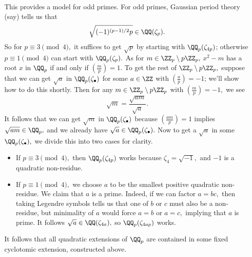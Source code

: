 This provides a model for odd primes. For odd primes, Gaussian period theory (say) tells us that
\[\sqrt{(-1)^{(p-1)/2}p}\in\QQ(\zeta_p).\]
So for $p\equiv3\pmod4,$ it suffices to get $\sqrt p$ by starting with $\QQ_p(\zeta_{4p})$; otherwise $p\equiv1\pmod4$ can start with $\QQ_p(\zeta_p).$ As for $m\in\ZZ_p\setminus p\ZZ_p,$ $x^2-m$ has a root $x$ in $\QQ_p$ if and only if $\left(\frac mp\right)=1.$ To get the rest of $\ZZ_p\setminus p\ZZ_p,$ suppose that we can get $\sqrt a$ in $\QQ_p(\zeta_\bullet)$ for some $a\in\ZZ$ with $\left(\frac ap\right)=-1$; we'll show how to do this shortly. Then for any $m\in\ZZ_p\setminus p\ZZ_p$ with $\left(\frac mp\right)=-1,$ we see
\[\sqrt m=\frac{\sqrt{am}}{\sqrt a}.\]
It follows that we can get $\sqrt m$ in $\QQ_p(\zeta_\bullet)$ because $\left(\frac{am}p\right)=1$ implies $\sqrt{am}\in\QQ_p,$ and we already have $\sqrt a\in\QQ_p(\zeta_\bullet).$ Now to get a $\sqrt a$ in some $\QQ_p(\zeta_\bullet),$ we divide this into two cases for clarity.
\begin{itemize}
    \item If $p\equiv3\pmod4,$ then $\QQ_p(\zeta_{4p})$ works because $\zeta_4=\sqrt{-1},$ and $-1$ is a quadratic non-residue.
    \item If $p\equiv1\pmod4,$ we choose $a$ to be the smallest positive quadratic non-residue. We claim that $a$ is a prime. Indeed, if we can factor $a=bc,$ then taking Legendre symbols tells us that one of $b$ or $c$ must also be a non-residue, but minimality of $a$ would force $a=b$ or $a=c,$ implying that $a$ is prime. It follows $\sqrt a\in\QQ(\zeta_{4a}),$ so $\QQ_p(\zeta_{4ap})$ works.
\end{itemize}
It follows that all quadratic extensions of $\QQ_p$ are contained in some fixed cyclotomic extension, constructed above.

